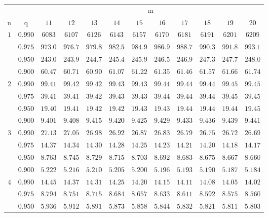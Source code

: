 \documentclass[11pt]{article}
\theoremstyle{definition}
\begin{document}
\begin{table}[H]
	\begin{tabularx}{\linewidth}{c | c | c c c c c c c c c c}
		& & \multicolumn{10}{c}{m}\\
		\cline{3-12}
		n & q & $11$ & $12$ & $13$ & $14$ & $15$ & $16$ & $17$ & $18$ & $19$ & $20$\\
		\hline
		$1$ & $0.990$ & $6083$ & $6107$ & $6126$ & $6143$ & $6157$ & $6170$ & $6181$ & $6191$ & $6201$ & $6209$ \\
		& $0.975$ & $973.0$ & $976.7$ & $979.8$ & $982.5$ & $984.9$ & $986.9$ & $988.7$ & $990.3$ & $991.8$ & $993.1$ \\
		& $0.950$ & $243.0$ & $243.9$ & $244.7$ & $245.4$ & $245.9$ & $246.5$ & $246.9$ & $247.3$ & $247.7$ & $248.0$ \\
		& $0.900$ & $60.47$ & $60.71$ & $60.90$ & $61.07$ & $61.22$ & $61.35$ & $61.46$ & $61.57$ & $61.66$ & $61.74$ \\
		$2$ & $0.990$ & $99.41$ & $99.42$ & $99.42$ & $99.43$ & $99.43$ & $99.44$ & $99.44$ & $99.44$ & $99.45$ & $99.45$ \\
		& $0.975$ & $39.41$ & $39.41$ & $39.42$ & $39.43$ & $39.43$ & $39.44$ & $39.44$ & $39.44$ & $39.45$ & $39.45$ \\
		& $0.950$ & $19.40$ & $19.41$ & $19.42$ & $19.42$ & $19.43$ & $19.43$ & $19.44$ & $19.44$ & $19.44$ & $19.45$ \\
		& $0.900$ & $9.401$ & $9.408$ & $9.415$ & $9.420$ & $9.425$ & $9.429$ & $9.433$ & $9.436$ & $9.439$ & $9.441$ \\
		$3$ & $0.990$ & $27.13$ & $27.05$ & $26.98$ & $26.92$ & $26.87$ & $26.83$ & $26.79$ & $26.75$ & $26.72$ & $26.69$ \\
		& $0.975$ & $14.37$ & $14.34$ & $14.30$ & $14.28$ & $14.25$ & $14.23$ & $14.21$ & $14.20$ & $14.18$ & $14.17$ \\
		& $0.950$ & $8.763$ & $8.745$ & $8.729$ & $8.715$ & $8.703$ & $8.692$ & $8.683$ & $8.675$ & $8.667$ & $8.660$ \\
		& $0.900$ & $5.222$ & $5.216$ & $5.210$ & $5.205$ & $5.200$ & $5.196$ & $5.193$ & $5.190$ & $5.187$ & $5.184$ \\
		$4$ & $0.990$ & $14.45$ & $14.37$ & $14.31$ & $14.25$ & $14.20$ & $14.15$ & $14.11$ & $14.08$ & $14.05$ & $14.02$ \\
		& $0.975$ & $8.794$ & $8.751$ & $8.715$ & $8.684$ & $8.657$ & $8.633$ & $8.611$ & $8.592$ & $8.575$ & $8.560$ \\
		& $0.950$ & $5.936$ & $5.912$ & $5.891$ & $5.873$ & $5.858$ & $5.844$ & $5.832$ & $5.821$ & $5.811$ & $5.803$ \\

\end{tabularx}
\end{table}
\end{document}
